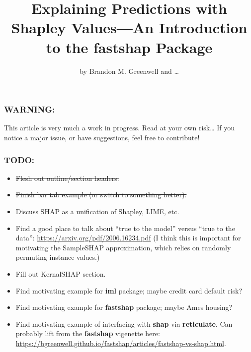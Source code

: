 \title{Explaining Predictions with Shapley Values---An Introduction to
the fastshap Package}
\author{by Brandon M. Greenwell and \ldots{}}

\maketitle


\hypertarget{warning}{%
\subsubsection{WARNING:}\label{warning}}

This article is very much a work in progress. Read at your own
risk\ldots{} If you notice a major issue, or have suggestions, feel free
to contribute!

\hypertarget{todo}{%
\subsubsection{TODO:}\label{todo}}

\begin{itemize}
\tightlist
\item
  \sout{Flesh out outline/section headers.}
\item
  \sout{Finish bar tab example (or switch to something better).}
\item
  Discuss SHAP as a unification of Shapley, LIME, etc.
\item
  Find a good place to talk about ``true to the model'' versus ``true to
  the data'': \url{https://arxiv.org/pdf/2006.16234.pdf} (I think this
  is important for motivating the SampleSHAP approximation, which relies
  on randomly permuting instance values.)
\item
  Fill out KernalSHAP section.
\item
  Find motivating example for \textbf{iml} package; maybe credit card
  default risk?
\item
  Find motivating example for \textbf{fastshap} package; maybe Ames
  housing?
\item
  Find motivating example of interfacing with \textbf{shap} via
  \textbf{reticulate}. Can probably lift from the \textbf{fastshap}
  vigenette here:
  \url{https://bgreenwell.github.io/fastshap/articles/fastshap-vs-shap.html}.
\end{itemize}

